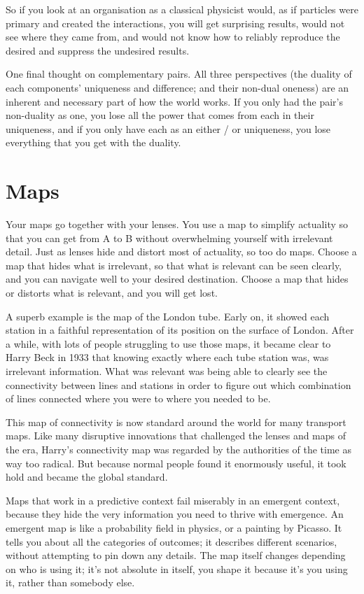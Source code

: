So if you look at an organisation as a classical physicist would, as if particles were primary and created the interactions, you will get surprising results, would not see where they came from, and would not know how to reliably reproduce the desired and suppress the undesired results. 


One final thought on complementary pairs. All three perspectives (the duality of each components' uniqueness and difference; and their non-dual oneness) are an inherent and necessary part of how the world works. If you only had the pair’s non-duality as one, you lose all the power that comes from each in their uniqueness, and if you only have each as an either / or uniqueness, you lose everything that you get with the duality.


\section{Maps}
Your maps go together with your lenses. You use a map to simplify actuality so that you can get from A to B without overwhelming yourself with irrelevant detail. Just as lenses hide and distort most of actuality, so too do maps. Choose a map that hides what is irrelevant, so that what is relevant can be seen clearly, and you can navigate well to your desired destination. Choose a map that hides or distorts what is relevant, and you will get lost.


A superb example is the map of the London tube. Early on, it showed each station in a faithful representation of its position on the surface of London. After a while, with lots of people struggling to use those maps, it became clear to Harry Beck in 1933 that knowing exactly where each tube station was, was irrelevant information. What was relevant was being able to clearly see the connectivity between lines and stations in order to figure out which combination of lines connected where you were to where you needed to be.


This map of connectivity is now standard around the world for many transport maps. Like many disruptive innovations that challenged the lenses and maps of the era, Harry's connectivity map was regarded by the authorities of the time as way too radical. But because normal people found it enormously useful, it took hold and became the global standard.


Maps that work in a predictive context fail miserably in an emergent context, because they hide the very information you need to thrive with emergence. An emergent map is like a probability field in physics, or a painting by Picasso. It tells you about all the categories of outcomes; it describes different scenarios, without attempting to pin down any details. The map itself changes depending on who is using it; it's not absolute in itself, you shape it because it's you using it, rather than somebody else.


